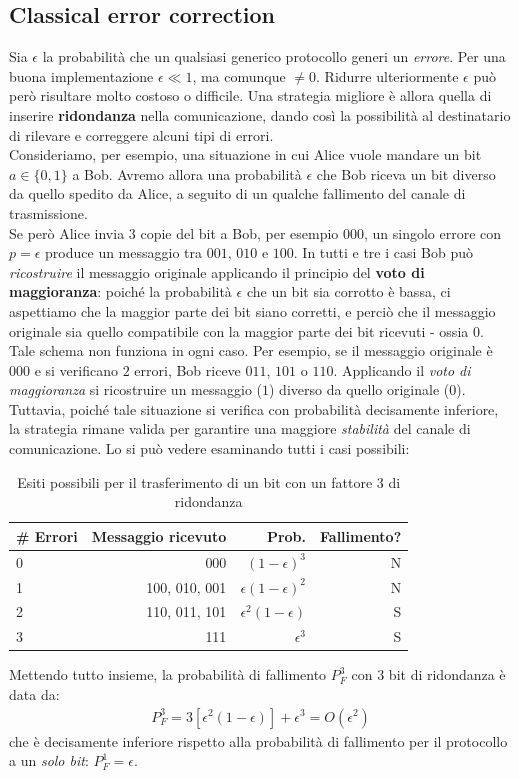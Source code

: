 \documentclass[../../InformazioneQuantistica.tex]{subfiles}
\begin{document}
\subsection{Classical error correction}
Sia $\epsilon$ la probabilità che un qualsiasi generico protocollo generi un \textit{errore}. Per una buona implementazione $\epsilon \ll 1$, ma comunque $\neq 0$. Ridurre ulteriormente $\epsilon$ può però risultare molto costoso o difficile. Una strategia migliore è allora quella di inserire \textbf{ridondanza} nella comunicazione, dando così la possibilità al destinatario di rilevare e correggere alcuni tipi di errori.\\

Consideriamo, per esempio, una situazione in cui Alice vuole mandare un bit $a \in \{0,1\}$ a Bob. Avremo allora una probabilità $\epsilon$ che Bob riceva un bit diverso da quello spedito da Alice, a seguito di un qualche fallimento del canale di trasmissione.\\
Se però Alice invia $3$ copie del bit a Bob, per esempio $000$, un singolo errore con $p=\epsilon$ produce un messaggio tra $001$, $010$ e $100$. In tutti e tre i casi Bob può \textit{ricostruire} il messaggio originale applicando il principio del \textbf{voto di maggioranza}: poiché la probabilità $\epsilon$ che un bit sia corrotto è bassa, ci aspettiamo che la maggior parte dei bit siano corretti, e perciò che il messaggio originale sia quello compatibile con la maggior parte dei bit ricevuti - ossia $0$.\\
Tale schema non funziona in ogni caso. Per esempio, se il messaggio originale è $000$ e si verificano $2$ errori, Bob riceve $011$, $101$ o $110$. Applicando il \textit{voto di maggioranza} si ricostruire un messaggio ($1$) diverso da quello originale ($0$). Tuttavia, poiché tale situazione si verifica con probabilità decisamente inferiore, la strategia rimane valida per garantire una maggiore \textit{stabilità} del canale di comunicazione. Lo si può vedere esaminando tutti i casi possibili:
\begin{table}[H]
\centering
\begin{tabular}{lrrr} \toprule
\# Errori & Messaggio ricevuto & Prob. & Fallimento? \\ \midrule
0 & 000 & $(1-\epsilon)^3$ & N\\
1 & 100, 010, 001 & $\epsilon(1-\epsilon)^2$ & N\\
2 & 110, 011, 101 & $\epsilon^2 (1-\epsilon)$ & S\\
3 & 111 & $\epsilon^3$ & S \\ \bottomrule
\end{tabular}
\caption{Esiti possibili per il trasferimento di un bit con un fattore $3$ di ridondanza}
\end{table}
Mettendo tutto insieme, la probabilità di fallimento $P_F^3$ con $3$ bit di ridondanza è data da:
\begin{align*}
P_F^3 = 3[\epsilon^2 (1-\epsilon)]+\epsilon^3 = O(\epsilon^2)
\end{align*}
che è decisamente inferiore rispetto alla probabilità di fallimento per il protocollo a un \textit{solo bit}: $P_F^1 = \epsilon$.
\end{document}
